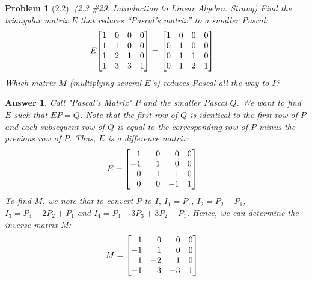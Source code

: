 \documentclass[12pt]{article}
\makeatletter
\theoremstyle{quest}
\newtheorem*{problem}{Problem}
\newtheorem*{answer}{Answer}
\newenvironment{sysmatrix}[1]
 {\left[\begin{array}{@{}#1@{}}}
 {\end{array}\right]}
\makeatother
\begin{document}
\begin{problem}[2.2]
(2.3 \#29. Introduction to Linear Algebra: Strang) Find the triangular matrix $E$ that reduces “Pascal’s matrix”
to a smaller Pascal:
\begin{alignat*}{1}
E
\begin{sysmatrix}{rrrr}
 1 & 0 & 0 & 0\\
 1 & 1 & 0 & 0\\
 1 & 2 & 1 & 0\\
 1 & 3 & 3 & 1
\end{sysmatrix}
&=
\begin{sysmatrix}{rrrr}
 1 & 0 & 0 & 0\\
 0 & 1 & 0 & 0\\
 0 & 1 & 1 & 0\\
 0 & 1 & 2 & 1
\end{sysmatrix}
\end{alignat*}
Which matrix $M$ (multiplying several $E$’s) reduces Pascal all the way to $I$?
\end{problem}
\begin{answer}
Call "Pascal's Matrix" $P$ and the smaller Pascal $Q$. We want to find $E$ such that $EP=Q$.
Note that the first row of $Q$ is identical to the first row of $P$ and each subsequent row of $Q$ is equal
to the corresponding row of $P$ minus the previous row of $P$. Thus, $E$ is a difference matrix:
\begin{alignat*}{1}
E &=
\begin{sysmatrix}{rrrr}
 1 & 0 & 0 & 0\\
 -1 & 1 & 0 & 0\\
 0 & -1 & 1 & 0\\
 0 & 0 & -1 & 1
\end{sysmatrix}
\end{alignat*}
To find $M$, we note that to convert $P$ to $I$, $I_1=P_1$, $I_2=P_2-P_1$,
$I_3=P_3-2P_2+P_1$ and $I_4= P_4-3P_3+3P_2-P_1$. Hence, we can determine the inverse matrix M:
\begin{alignat*}{1}
M &=
\begin{sysmatrix}{rrrr}
 1 & 0 & 0 & 0\\
 -1 & 1 & 0 & 0\\
 1 & -2 & 1 & 0\\
 -1 & 3 & -3 & 1
\end{sysmatrix}
\end{alignat*}
\end{answer}
\end{document}
